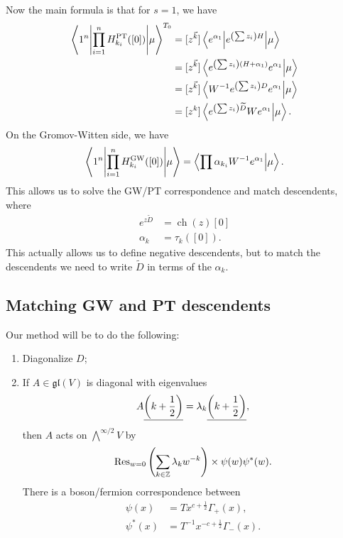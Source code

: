 \documentclass[leqno, openany]{memoir}
\theoremstyle{definition}
\theoremstyle{remark}
\theoremstyle{plain}
\theoremstyle{definition}
\theoremstyle{remark}
\newcommand{\Z}{\mathbb{Z}}
\newcommand{\mf}[1]{\mathfrak{#1}}
\newcommand{\mr}[1]{\mathrm{#1}}
\newcommand{\ul}[1]{\underline{#1}}
\newcommand{\wt}[1]{\widetilde{#1}}
\DeclareMathOperator{\ch}{ch}
\begin{document}
Now the main formula is that for $s=1$, we have
\begin{align*} 
    \mel**{1^n}{\prod_{i=1}^n H_{k_i}^{\mr{PT}}([0])}{\mu}^{T_0} &= [z^{\vec{k}}] \mel**{e^{\alpha_1}}{e^{\qty(\sum z_i)H}}{\mu} \\
    &= [z^{\vec{k}}]\braket{e^{\qty(\sum z_i)(H+\alpha_1)}e^{\alpha_1}}{\mu} \\
    &= [z^{\vec{k}}] \braket{W^{-1} e^{\qty(\sum z_i) D}e^{\alpha_1}}{\mu} \\
    &= [z^k] \braket{e^{\qty(\sum z_i)\wt{D}}We^{\alpha_1}}{\mu}.
\end{align*}
On the Gromov-Witten side, we have
\begin{align*}
    \mel**{1^n}{\prod_{i=1}^n H_{k_i}^{\mr{GW}}([0])}{\mu} = \braket{\prod \alpha_{k_i}W^{-1}e^{\alpha_1}}{\mu}.
\end{align*}
This allows us to solve the GW/PT correspondence and match descendents, where
\begin{align*}
    e^{z\wt{D}} &= \ch(z)[0] \\
    \alpha_k &= \tau_k([0]).
\end{align*}
This actually allows us to define negative descendents, but to match the descendents we need to write $\wt{D}$ in terms of the $\alpha_k$.

\subsection{Matching GW and PT descendents}

Our method will be to do the following:
\begin{enumerate}
    \item Diagonalize $D$;
    \item If $A \in \mf{gl}(V)$ is diagonal with eigenvalues
        \[ A \ul{\qty(k+\frac{1}{2})} = \lambda_k \ul{\qty(k+\frac{1}{2})}, \]
        then $A$ acts on $\bigwedge^{\infty/2} V$ by
        \[ \Res_{w=0} \qty(\sum_{k \in \Z} \lambda_k w^{-k}) \times \psi(w) \psi^*(w). \]
        There is a boson/fermion correspondence between
        \begin{align*}
            \psi(x) &= T x^{c+\frac{1}{2}} \Gamma_+(x), \\
            \psi^*(x) &= T^{-1} x^{-c+\frac{1}{2}} \Gamma_-(x).
        \end{align*}
\end{enumerate}
\end{document}
